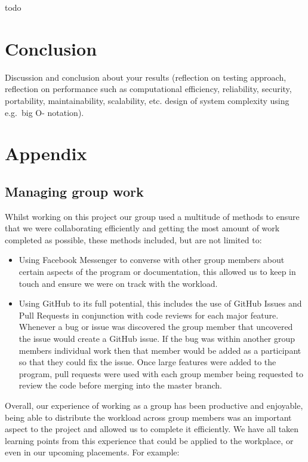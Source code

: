 \documentclass[
  english,
  a4paper,
,tablecaptionabove
]{scrartcl}
\providecommand{\tightlist}{%
  \setlength{\itemsep}{0pt}\setlength{\parskip}{0pt}}
\begin{document}
todo

\newpage

\hypertarget{conclusion}{%
\section{Conclusion}\label{conclusion}}

Discussion and conclusion about your results (reflection on testing
approach, reflection on performance such as computational efficiency,
reliability, security, portability, maintainability, scalability, etc.
design of system complexity using e.g.~big O- notation).

\newpage

\hypertarget{appendix}{%
\section{Appendix}\label{appendix}}

\hypertarget{managing-group-work}{%
\subsection{Managing group work}\label{managing-group-work}}

Whilst working on this project our group used a multitude of methods to
ensure that we were collaborating efficiently and getting the most
amount of work completed as possible, these methods included, but are
not limited to:

\begin{itemize}
\tightlist
\item
  Using Facebook Messenger to converse with other group members about
  certain aspects of the program or documentation, this allowed us to
  keep in touch and ensure we were on track with the workload.
\item
  Using GitHub to its full potential, this includes the use of GitHub
  Issues and Pull Requests in conjunction with code reviews for each
  major feature. Whenever a bug or issue was discovered the group member
  that uncovered the issue would create a GitHub issue. If the bug was
  within another group members individual work then that member would be
  added as a participant so that they could fix the issue. Once large
  features were added to the program, pull requests were used with each
  group member being requested to review the code before merging into
  the master branch.
\end{itemize}

Overall, our experience of working as a group has been productive and
enjoyable, being able to distribute the workload across group members
was an important aspect to the project and allowed us to complete it
efficiently. We have all taken learning points from this experience that
could be applied to the workplace, or even in our upcoming placements.
For example:
\end{document}
